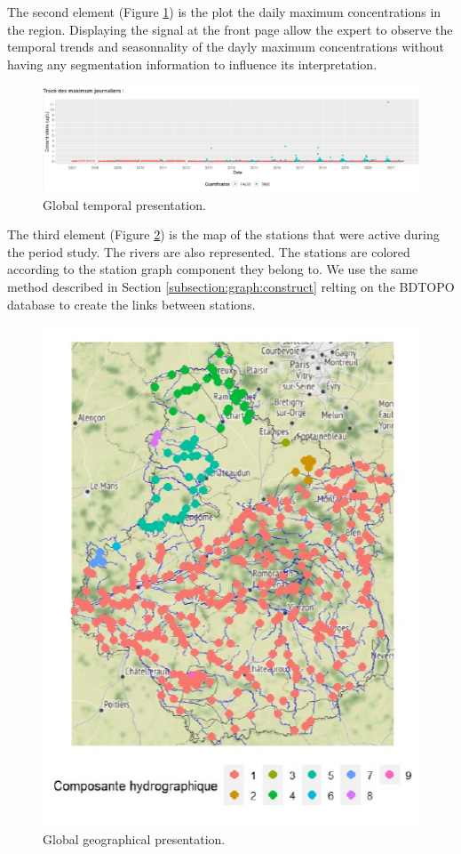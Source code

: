 The second element (Figure \ref{fig:Imapp1}) is the plot the daily maximum concentrations in the region. Displaying the signal at the front page allow the expert to observe the temporal trends and seasonnality of the dayly maximum concentrations without having any segmentation information to influence its interpretation.

\begin{figure}[ht]
  \centering
  \includegraphics[]{figs/Chap6/Im_app1.pdf}
  \caption{Global temporal presentation.}
  \label{fig:Imapp1}
\end{figure}

The third element (Figure \ref{fig:Imapp2}) is the map of the stations that were active during the period study. The rivers are also represented. The stations are colored according to the station graph component they belong to. We use the same method described in Section \ref{subsection:graph:construct} relting on the BDTOPO database to create the links between stations. 

\begin{figure}[H]
  \centering
  \includegraphics{figs/Chap6/Im_app2.pdf}
  \caption{Global geographical presentation.}
  \label{fig:Imapp2}
\end{figure}


